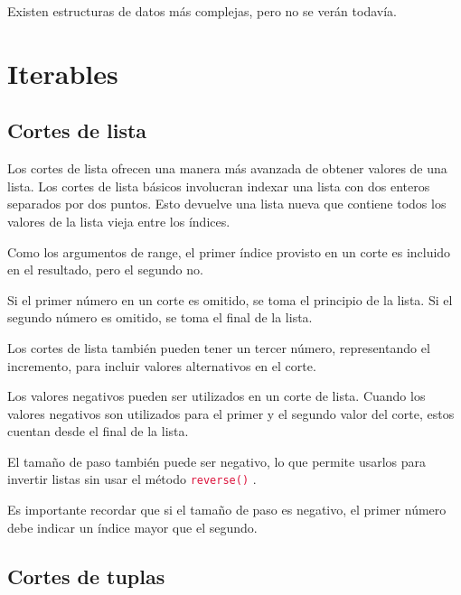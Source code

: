 \documentclass{report}
\newcommand{\ttt}[1]{
  \textcolor{Crimson}{\texttt{#1}}
}
\begin{document}
Existen estructuras de datos más complejas, pero no se verán todavía.

\clearpage\chapter{Iterables}



\section{Cortes de lista}

Los cortes de lista ofrecen una manera más avanzada de obtener valores de una lista. Los cortes de lista básicos involucran indexar una lista con dos enteros separados por dos puntos. Esto devuelve una lista nueva que contiene todos los valores de la lista vieja entre los índices.


Como los argumentos de range, el primer índice provisto en un corte es incluido en el resultado, pero el segundo no.\smallskip

Si el primer número en un corte es omitido, se toma el principio de la lista. Si el segundo número es omitido, se toma el final de la lista.


Los cortes de lista también pueden tener un tercer número, representando el incremento, para incluir valores alternativos en el corte.


Los valores negativos pueden ser utilizados en un corte de lista. Cuando los valores negativos son utilizados para el primer y el segundo valor del corte, estos cuentan desde el final de la lista.


El tamaño de paso también puede ser negativo, lo que permite usarlos para invertir listas sin usar el método \ttt{reverse()}.


Es importante recordar que si el tamaño de paso es negativo, el primer número debe indicar un índice mayor que el segundo.

\section{Cortes de tuplas}
\end{document}
